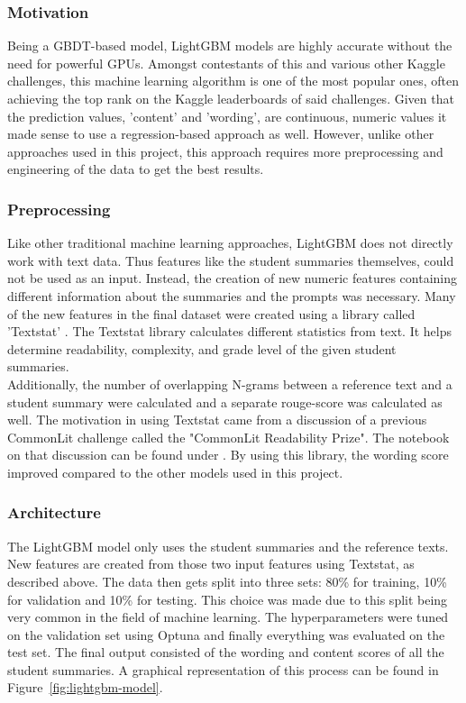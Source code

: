 \subsubsection{Motivation}
Being a GBDT-based model, LightGBM models are highly accurate without the need for powerful GPUs. Amongst contestants of this and various other Kaggle challenges, this machine learning algorithm is one of the most popular ones, often achieving the top rank on the Kaggle leaderboards of said challenges. Given that the prediction values, 'content' and 'wording', are continuous, numeric values it made sense to use a regression-based approach as well.
However, unlike other approaches used in this project, this approach requires more preprocessing and engineering of the data to get the best results.

\subsubsection{Preprocessing}
Like other traditional machine learning approaches, LightGBM does not directly work with text data. Thus features like the student summaries themselves, could not be used as an input. Instead, the creation of new numeric features containing different information about the summaries and the prompts was necessary. Many of the new features in the final dataset were created using a library called 'Textstat' \parencite{a2022_textstattextstat}.  %
The Textstat library calculates different statistics from text. It helps determine readability, complexity, and grade level of the given student summaries. \\ Additionally, the number of overlapping N-grams between a reference text and a student summary were calculated and a separate \gls{rouge}-score was calculated as well. The motivation in using Textstat came from a discussion of a previous CommonLit challenge called the "CommonLit Readability Prize".
The notebook on that discussion can be found under \cite{yhirakawa_2021_textstat}. By using this library, the wording score improved compared to the other models used in this project.

\subsubsection{Architecture}
The LightGBM model only uses the student summaries and the reference texts. New features are created from those two input features using Textstat, as described above. The data then gets split into three sets: 80\% for training, 10\% for validation and 10\% for testing. This choice was made due to this split being very common in the field of machine learning.  %
The hyperparameters were tuned on the validation set using Optuna and finally everything was evaluated on the test set. The final output consisted of the wording and content scores of all the student summaries.
A graphical representation of this process can be found in Figure~\ref{fig:lightgbm-model}.

